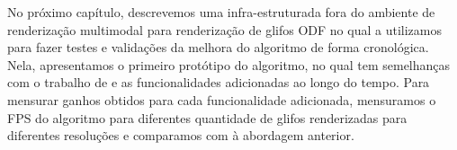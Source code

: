 \documentclass[
    12pt,                %
    oneside,            %
    a4paper,            %
    english,            %
    french,                %
    spanish,            %
    brazil                %
    ]{abntex2}
\begin{document}



No próximo capítulo, descrevemos uma infra-estruturada fora do ambiente de renderização multimodal para renderização de glifos ODF no qual a utilizamos para fazer testes e validações da melhora do algoritmo de forma cronológica. Nela, apresentamos o primeiro protótipo do algoritmo, no qual tem semelhanças com o trabalho de  e as funcionalidades adicionadas ao longo do tempo. Para mensurar ganhos obtidos para cada funcionalidade adicionada, mensuramos o FPS do algoritmo para diferentes quantidade de glifos renderizadas para diferentes resoluções e comparamos com à abordagem anterior.

\end{document}
